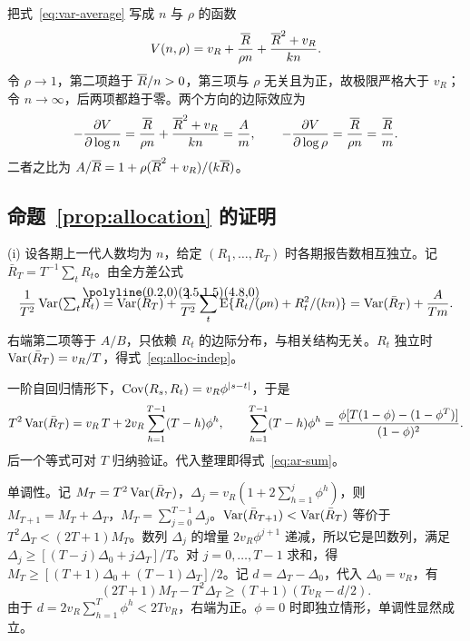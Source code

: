 把式~\eqref{eq:var-average} 写成 $n$ 与 $\rho$ 的函数
\begin{equation}
  V(n,\rho)=v_R+\frac{\overline{R}}{\rho n}+\frac{\overline{R}^2+v_R}{kn}.
\end{equation}
令 $\rho\to1$，第二项趋于 $\overline{R}/n>0$，第三项与 $\rho$ 无关且为正，故极限严格大于 $v_R$；令 $n\to\infty$，后两项都趋于零。两个方向的边际效应为
\begin{equation}
  -\frac{\partial V}{\partial\log n}=\frac{\overline{R}}{\rho n}+\frac{\overline{R}^2+v_R}{kn}=\frac{A}{m},\qquad
  -\frac{\partial V}{\partial\log\rho}=\frac{\overline{R}}{\rho n}=\frac{\overline{R}}{m}.
\end{equation}
二者之比为 $A/\overline{R}=1+\rho(\overline{R}^2+v_R)/(k\overline{R})$。

\subsection{\texorpdfstring{命题~\ref{prop:allocation} 的证明}{命题 3 的证明}}

(i) 设各期上一代人数均为 $n$，给定 $(R_1,\dots,R_T)$ 时各期报告数相互独立。记 $\bar R_T=T^{-1}\sum_tR_t$。由全方差公式
\begin{equation}
  \frac{1}{T^2}\Var({\textstyle\sum_t}\widehat R_t)=\Var(\bar R_T)+\frac1{T^2}\sum_t\E\{R_t/(\rho n)+R_t^2/(kn)\}
  =\Var(\bar R_T)+\frac{A}{Tm}.
\end{equation}
右端第二项等于 $A/B$，只依赖 $R_t$ 的边际分布，与相关结构无关。$R_t$ 独立时 $\operatorname{Var}(\bar R_T)=v_R/T$，得式~\eqref{eq:alloc-indep}。

一阶自回归情形下，$\operatorname{Cov}(R_s,R_t)=v_R\phi^{|s-t|}$，于是
\begin{equation}
  T^2\operatorname{Var}(\bar R_T)=v_R\,T+2v_R\sum_{h=1}^{T-1}(T-h)\phi^h,\qquad
  \sum_{h=1}^{T-1}(T-h)\phi^h=\frac{\phi[T(1-\phi)-(1-\phi^T)]}{(1-\phi)^2}.
\end{equation}
后一个等式可对 $T$ 归纳验证。代入整理即得式~\eqref{eq:ar-sum}。

单调性。记 $M_T=T^2\operatorname{Var}(\bar R_T)$，$\Delta_j=v_R(1+2\sum_{h=1}^{j}\phi^h)$，则 $M_{T+1}=M_T+\Delta_T$，$M_T=\sum_{j=0}^{T-1}\Delta_j$。$\operatorname{Var}(\bar R_{T+1})<\operatorname{Var}(\bar R_T)$ 等价于 $T^2\Delta_T<(2T+1)M_T$。数列 $\Delta_j$ 的增量 $2v_R\phi^{j+1}$ 递减，所以它是凹数列，满足 $\Delta_j\geq[(T-j)\Delta_0+j\Delta_T]/T$。对 $j=0,\dots,T-1$ 求和，得 $M_T\geq[(T+1)\Delta_0+(T-1)\Delta_T]/2$。记 $d=\Delta_T-\Delta_0$，代入 $\Delta_0=v_R$，有
\begin{equation}
  (2T+1)M_T-T^2\Delta_T\geq(T+1)(Tv_R-d/2).
\end{equation}
由于 $d=2v_R\sum_{h=1}^{T}\phi^h<2Tv_R$，右端为正。$\phi=0$ 时即独立情形，单调性显然成立。


